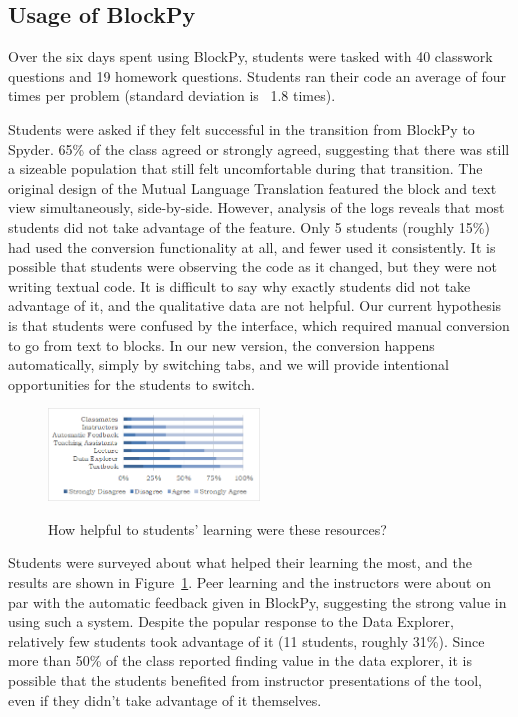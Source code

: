\documentclass{sig-alternate}
\begin{document}
\subsection{Usage of BlockPy}

Over the six days spent using BlockPy, students were tasked with 40 classwork questions and 19 homework questions.
Students ran their code an average of four times per problem (standard deviation is ~1.8 times).

Students were asked if they felt successful in the transition from BlockPy to Spyder.
65\% of the class agreed or strongly agreed, suggesting that there was still a sizeable population that still felt uncomfortable during that transition.
The original design of the Mutual Language Translation featured the block and text view simultaneously, side-by-side.
However, analysis of the logs reveals that most students did not take advantage of the feature.
Only 5 students (roughly 15\%) had used the conversion functionality at all, and fewer used it consistently.
It is possible that students were observing the code as it changed, but they were not writing textual code.
It is difficult to say why exactly students did not take advantage of it, and the qualitative data are not helpful.
Our current hypothesis is that students were confused by the interface, which required manual conversion to go from text to blocks.
In our new version, the conversion happens automatically, simply by switching tabs, and we will provide intentional opportunities for the students to switch.

\begin{figure}
\includegraphics[width=0.5\textwidth]{images/surveyHelpfulness}
\label{fig-survey-helpfulness}
\caption{How helpful to students' learning were these resources?}
\end{figure}

Students were surveyed about what helped their learning the most, and the results are shown in Figure~\ref{fig-survey-helpfulness}.
Peer learning and the instructors were about on par with the automatic feedback given in BlockPy, suggesting the strong value in using such a system.
Despite the popular response to the Data Explorer, relatively few students took advantage of it (11 students, roughly 31\%).
Since more than 50\% of the class reported finding value in the data explorer, it is possible that the students benefited from instructor presentations of the tool, even if they didn't take advantage of it themselves. 
\end{document}
